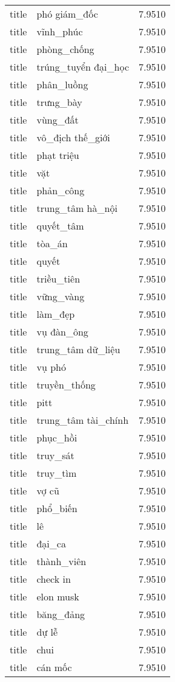 \documentclass{article}
\begin{document}
\begin{tabular}{lll}
title & phó giám\_đốc & 7.9510\\
title & vĩnh\_phúc & 7.9510\\
title & phòng\_chống & 7.9510\\
title & trúng\_tuyển đại\_học & 7.9510\\
title & phân\_luồng & 7.9510\\
title & trưng\_bày & 7.9510\\
title & vùng\_đất & 7.9510\\
title & vô\_địch thế\_giới & 7.9510\\
title & phạt triệu & 7.9510\\
title & vặt & 7.9510\\
title & phản\_công & 7.9510\\
title & trung\_tâm hà\_nội & 7.9510\\
title & quyết\_tâm & 7.9510\\
title & tòa\_án & 7.9510\\
title & quyết & 7.9510\\
title & triều\_tiên & 7.9510\\
title & vững\_vàng & 7.9510\\
title & làm\_đẹp & 7.9510\\
title & vụ đàn\_ông & 7.9510\\
title & trung\_tâm dữ\_liệu & 7.9510\\
title & vụ phó & 7.9510\\
title & truyền\_thống & 7.9510\\
title & pitt & 7.9510\\
title & trung\_tâm tài\_chính & 7.9510\\
title & phục\_hồi & 7.9510\\
title & truy\_sát & 7.9510\\
title & truy\_tìm & 7.9510\\
title & vợ cũ & 7.9510\\
title & phổ\_biến & 7.9510\\
title & lê & 7.9510\\
title & đại\_ca & 7.9510\\
title & thành\_viên & 7.9510\\
title & check in & 7.9510\\
title & elon musk & 7.9510\\
title & băng\_đảng & 7.9510\\
title & dự lễ & 7.9510\\
title & chui & 7.9510\\
title & cán mốc & 7.9510\\

\end{tabular}
\end{document}
